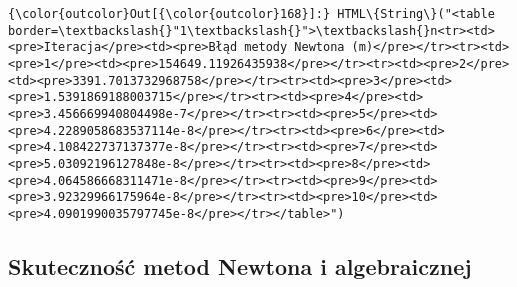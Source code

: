 \documentclass[11pt]{article}
\begin{document}
\begin{Verbatim}[commandchars=\\\{\}]
{\color{outcolor}Out[{\color{outcolor}168}]:} HTML\{String\}("<table border=\textbackslash{}"1\textbackslash{}">\textbackslash{}n<tr><td><pre>Iteracja</pre><td><pre>Błąd metody Newtona (m)</pre></tr><tr><td><pre>1</pre><td><pre>154649.11926435938</pre></tr><tr><td><pre>2</pre><td><pre>3391.7013732968758</pre></tr><tr><td><pre>3</pre><td><pre>1.5391869188003715</pre></tr><tr><td><pre>4</pre><td><pre>3.456669940804498e-7</pre></tr><tr><td><pre>5</pre><td><pre>4.2289058683537114e-8</pre></tr><tr><td><pre>6</pre><td><pre>4.108422737137377e-8</pre></tr><tr><td><pre>7</pre><td><pre>5.03092196127848e-8</pre></tr><tr><td><pre>8</pre><td><pre>4.064586668311471e-8</pre></tr><tr><td><pre>9</pre><td><pre>3.92329966175964e-8</pre></tr><tr><td><pre>10</pre><td><pre>4.0901990035797745e-8</pre></tr></table>")
\end{Verbatim}
            
    \subsection{Skuteczność metod Newtona i
algebraicznej}\label{skutecznoux15bux107-metod-newtona-i-algebraicznej}
\end{document}
